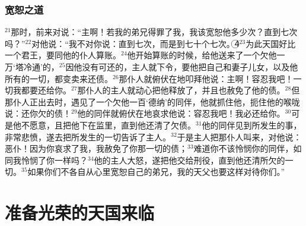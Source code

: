 \subsubsection{宽恕之道}
$^{21}$那时，\UL[伯多禄]前来对\UL[耶稣]说：“主啊！若我的弟兄得罪了我，我该宽恕他多少次？直到七次吗？”$^{22}$\UL[耶稣]对他说：“我不对你说：直到七次，而是到七十个七次。\textcircled{4}$^{23}$为此天国好比一个君王，要同他的仆人算账。$^{24}$他开始算账的时候，给他送来了一个欠他一万‘塔冷通’的，$^{25}$因他没有可还的，主人就下令，要他把自己和妻子儿女，以及他所有的一切，都变卖来还债。$^{26}$那仆人就俯伏在地叩拜他说：主啊！容忍我吧！一切我都要还给你。$^{27}$那仆人的主人就动心把他释放了，并且也赦免了他的债。$^{28}$但那仆人正出去时，遇见了一个欠他一百‘德纳’的同伴，他就抓住他，扼住他的喉咙说：还你欠的债！$^{29}$他的同伴就俯伏在地哀求他说：容忍我吧！我必还给你。$^{30}$可是他不愿意，且把他下在监里，直到他还清了欠债。$^{31}$他的同伴见到所发生的事，非常悲愤，遂去把所发生的一切告诉了主人。$^{32}$于是主人把那仆人叫来，对他说：恶仆！因为你哀求了我，我赦免了你那一切的债；$^{33}$难道你不该怜悯你的同伴，如同我怜悯了你一样吗？$^{34}$他的主人大怒，遂把他交给刑役，直到他还清所欠的一切。$^{35}$如果你们不各自从心里宽恕自己的弟兄，我的天父也要这样对待你们。”


\section{准备光荣的天国来临}
